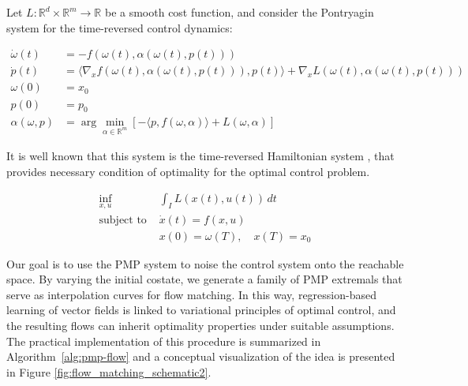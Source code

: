 \documentclass{article}
\begin{document}
Let $L: \mathbb{R}^d \times \mathbb{R}^m \rightarrow \mathbb{R}$ be a smooth cost function, and consider the Pontryagin system for the time-reversed control dynamics:

\begin{align}
\label{eq:pmp}
\dot{\omega}(t) &= -f(\omega(t), \alpha(\omega(t), p(t))) \\
\dot{p}(t) &= \langle \nabla_x f(\omega(t), \alpha(\omega(t), p(t))), p(t) \rangle + \nabla_x L(\omega(t), \alpha(\omega(t), p(t))) \nonumber \\
\omega(0) &= x_0 \nonumber \\
p(0) &= p_0 \nonumber \\
\alpha(\omega, p) &= \arg\min_{\alpha \in \mathbb{R}^m} \left[-\langle p, f(\omega, \alpha) \rangle + L(\omega, \alpha)\right] \nonumber
\end{align}

It is well known that this system is the time-reversed Hamiltonian system \cite{cannarsa2008semiconcavity}, that provides necessary condition of optimality for the optimal control problem.

\begin{align}
\label{eq:nonlinear-opt}
\inf_{x,u} &\int_I L(x(t),u(t)) \, dt \\
\text{subject to } &\dot{x}(t) = f(x,u) \nonumber \\
&x(0) = \omega(T) , \quad x(T) = x_0 \nonumber
\end{align}

Our goal is to use the PMP system to noise the control system onto the reachable space. By varying the initial costate, we generate a family of PMP extremals that serve as interpolation curves for flow matching. 
In this way, regression-based learning of vector fields is linked to variational principles of optimal control, and the resulting flows can inherit optimality properties under suitable assumptions. 
The practical implementation of this procedure is summarized in Algorithm~\ref{alg:pmp-flow} and a conceptual visualization of the idea is presented in Figure \ref{fig:flow_matching_schematic2}.
\end{document}
